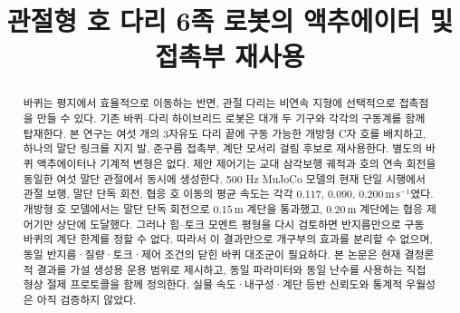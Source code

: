 \documentclass[letterpaper,10pt,conference]{ieeeconf}
\title{\LARGE \bf
관절형 호 다리 6족 로봇의 액추에이터 및 접촉부 재사용}
\author{\mbox{}}
\begin{document}
\maketitle
\thispagestyle{empty}
\pagestyle{empty}

\begin{abstract}
바퀴는 평지에서 효율적으로 이동하는 반면, 관절 다리는 비연속 지형에 선택적으로
접촉점을 만들 수 있다. 기존 바퀴--다리 하이브리드 로봇은 대개 두 기구와 각각의
구동계를 함께 탑재한다. 본 연구는 여섯 개의 3자유도 다리 끝에 구동 가능한
개방형 C자 호를 배치하고, 하나의 말단 링크를 지지 발, 준구름 접촉부, 계단
모서리 걸림 후보로 재사용한다. 별도의 바퀴 액추에이터나 기계적 변형은 없다.
제안 제어기는 교대 삼각보행 궤적과 호의 연속 회전을 동일한 여섯 말단 관절에서
동시에 생성한다. 500 Hz MuJoCo 모델의 현재 단일 시행에서 관절 보행, 말단 단독
회전, 협응 호 이동의 평균 속도는 각각 $0.117$, $0.090$,
$0.200\,\mathrm{m\,s^{-1}}$였다. 개방형 호 모델에서는 말단 단독 회전으로
$0.15\,\mathrm{m}$ 계단을 통과했고, $0.20\,\mathrm{m}$ 계단에는 협응 제어기만
상단에 도달했다. 그러나 힘--토크 모멘트 평형을 다시 검토하면 반지름만으로 구동
바퀴의 계단 한계를 정할 수 없다. 따라서 이 결과만으로 개구부의 효과를 분리할 수
없으며, 동일 반지름·질량·토크·제어 조건의 닫힌 바퀴 대조군이 필요하다. 본 논문은
현재 결정론적 결과를 가설 생성용 운용 범위로 제시하고, 동일 파라미터와 동일
난수를 사용하는 직접 형상 절제 프로토콜을 함께 정의한다. 실물 속도·내구성·계단
등반 신뢰도와 통계적 우월성은 아직 검증하지 않았다.
\end{abstract}











\end{document}
